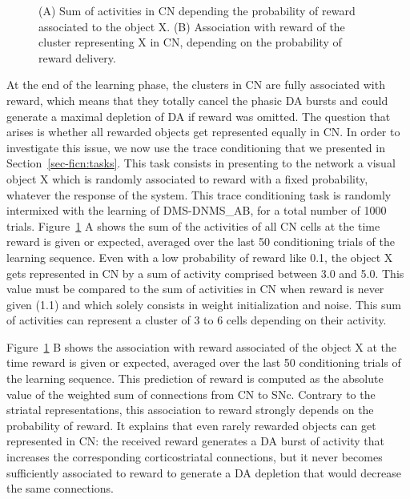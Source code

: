 \documentclass[
  11pt,
  a4paper,
]{scrbook}
\begin{document}
\begin{figure}


\caption{\label{fig-ficn:trace}(A) Sum of activities in CN depending the
probability of reward associated to the object X. (B) Association with
reward of the cluster representing X in CN, depending on the probability
of reward delivery.}

\end{figure}%

At the end of the learning phase, the clusters in CN are fully
associated with reward, which means that they totally cancel the phasic
DA bursts and could generate a maximal depletion of DA if reward was
omitted. The question that arises is whether all rewarded objects get
represented equally in CN. In order to investigate this issue, we now
use the trace conditioning that we presented in
Section~\ref{sec-ficn:tasks}. This task consists in presenting to the
network a visual object X which is randomly associated to reward with a
fixed probability, whatever the response of the system. This trace
conditioning task is randomly intermixed with the learning of
DMS-DNMS\_AB, for a total number of 1000 trials.
Figure~\ref{fig-ficn:trace} A shows the sum of the activities of all CN
cells at the time reward is given or expected, averaged over the last 50
conditioning trials of the learning sequence. Even with a low
probability of reward like 0.1, the object X gets represented in CN by a
sum of activity comprised between 3.0 and 5.0. This value must be
compared to the sum of activities in CN when reward is never given (1.1)
and which solely consists in weight initialization and noise. This sum
of activities can represent a cluster of 3 to 6 cells depending on their
activity.

Figure~\ref{fig-ficn:trace} B shows the association with reward
associated of the object X at the time reward is given or expected,
averaged over the last 50 conditioning trials of the learning sequence.
This prediction of reward is computed as the absolute value of the
weighted sum of connections from CN to SNc. Contrary to the striatal
representations, this association to reward strongly depends on the
probability of reward. It explains that even rarely rewarded objects can
get represented in CN: the received reward generates a DA burst of
activity that increases the corresponding corticostriatal connections,
but it never becomes sufficiently associated to reward to generate a DA
depletion that would decrease the same connections.
\end{document}

